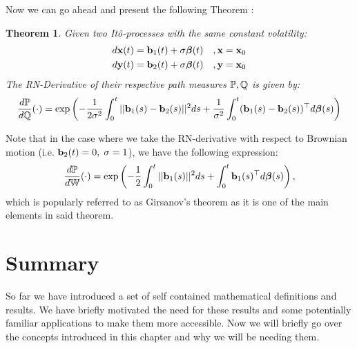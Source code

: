 \documentclass[a4paper,12pt,twoside,openright]{report}
\newtheorem{theorem}{Theorem}
\theoremstyle{definition}
\begin{document}
Now we can go ahead and present the following Theorem \citep{sarkka2019applied}:
\begin{theorem}\label{thrm:ito_ratio}\citep{sarkka2019applied}
Given two Itô-processes with the same constant volatility: 
    \begin{align*}
        d{\mathbf{x}}(t) = {\mathbf{b}}_1(t) + \sigma {\bm{\beta}}(t) \quad, {\mathbf{x}} = {\mathbf{x}}_0\\
        d{\mathbf{y}}(t) = {\mathbf{b}}_2(t) + \sigma{\bm{\beta}}(t) \quad, {\mathbf{y}} = {\mathbf{x}}_0
    \end{align*}
The RN-Derivative of their respective path measures ${\mathbb{P}},{\mathbb{Q}}$ is given by:
\begin{align} \label{eq:girsanov}
    \frac{d{\mathbb{P}}}{d{\mathbb{Q}}}(\cdot) = \exp\left(-\frac{1}{2\sigma^2}\int_0^t ||{\mathbf{b}}_1(s) - {\mathbf{b}}_2(s)||^2 ds + \frac{1}{\sigma^2}\int_0^t ({\mathbf{b}}_1(s) - {\mathbf{b}}_2(s))^{\top}d{\bm{\beta}}(s) \right)
\end{align}
\end{theorem}
Note that in the case where we take the RN-derivative with respect to Brownian motion (i.e. ${\mathbf{b}}_2(t) =0, \; \sigma=1$), we have the following expression:
\begin{align} \label{eq:girsanov_0}
    \frac{d{\mathbb{P}}}{d\mathbb{W}}(\cdot) = \exp\left(-\frac{1}{2}\int_0^t ||{\mathbf{b}}_1(s) ||^2 ds + \int_0^t {\mathbf{b}}_1(s)^{\top}d{\bm{\beta}}(s) \right),
\end{align}
which is popularly referred to as Girsanov's theorem as it is one of the main elements in said theorem.

\section{Summary }

So far we have introduced a set of self contained mathematical definitions and results. We have briefly motivated the need for these results and some potentially familiar applications to make them more accessible. Now we will briefly go over the concepts introduced in this chapter and why we will be needing them.
\end{document}
